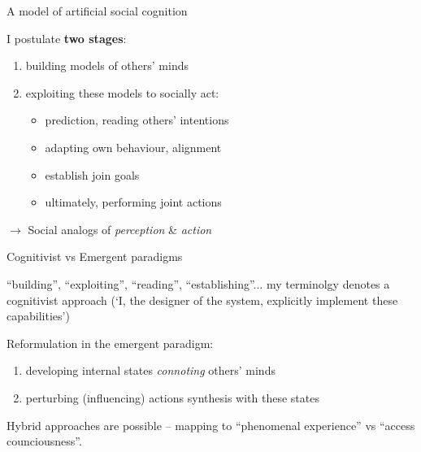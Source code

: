 \documentclass[compress]{beamer}
\begin{document}
\begin{frame}{A model of artificial social cognition}

    I postulate {\bf two stages}:

    \begin{enumerate}
        \item building models of others' minds
        \item exploiting these models to socially act:
            \begin{itemize}
                \item prediction, reading others' intentions
                \item adapting own behaviour, alignment
                \item establish join goals
                \item ultimately, performing joint actions
            \end{itemize}
    \end{enumerate}

    \vspace{2em}
    $\rightarrow$ Social analogs of \emph{perception} \& \emph{action}

\end{frame}

{
\begin{frame}{Cognitivist vs Emergent paradigms}

    ``building'', ``exploiting'', ``reading'', ``establishing''... my terminolgy
    denotes a cognitivist approach (`I, the designer of the system, explicitly implement
    these capabilities')

    \pause
    
    Reformulation in the emergent paradigm:

    \begin{enumerate}
        \item developing internal states \emph{connoting} others' minds
        \item perturbing (influencing) actions synthesis with these states
    \end{enumerate}

    \pause

    Hybrid approaches are possible -- mapping to ``phenomenal experience'' vs
    ``access counciousness''.
\end{frame}
}
\end{document}
